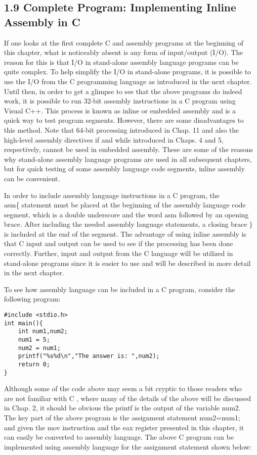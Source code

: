 \documentclass[10pt]{article}
\begin{document}
\subsection*{1.9 Complete Program: Implementing Inline Assembly in C}
If one looks at the first complete C and assembly programs at the beginning of this chapter, what is noticeably absent is any form of input/output (I/O). The reason for this is that I/O in stand-alone assembly language programs can be quite complex. To help simplify the I/O in stand-alone programs, it is possible to use the I/O from the C programming language as introduced in the next chapter. Until then, in order to get a glimpse to see that the above programs do indeed work, it is possible to run 32-bit assembly instructions in a C program using Visual C++. This process is known as inline or embedded assembly and is a quick way to test program segments. However, there are some disadvantages to this method. Note that 64-bit processing introduced in Chap. 11 and also the high-level assembly directives if and while introduced in Chaps. 4 and 5, respectively, cannot be used in embedded assembly. These are some of the reasons why stand-alone assembly language programs are used in all subsequent chapters, but for quick testing of some assembly language code segments, inline assembly can be convenient.

In order to include assembly language instructions in a C program, the $\qquad$ asm\{ statement must be placed at the beginning of the assembly language code segment, which is a double underscore and the word asm followed by an opening brace. After including the needed assembly language statements, a closing brace $\}$ is included at the end of the segment. The advantage of using inline assembly is that C input and output can be used to see if the processing has been done correctly. Further, input and output from the C language will be utilized in stand-alone programs since it is easier to use and will be described in more detail in the next chapter.

To see how assembly language can be included in a C program, consider the following program:

\begin{verbatim}
#include <stdio.h>
int main(){
    int num1,num2;
    num1 = 5;
    num2 = num1;
    printf("%s%d\n","The answer is: ",num2);
    return 0;
}
\end{verbatim}

Although some of the code above may seem a bit cryptic to those readers who are not familiar with C , where many of the details of the above will be discussed in Chap. 2, it should be obvious the printf is the output of the variable num2. The key part of the above program is the assignment statement num2=num1; and given the mov instruction and the eax register presented in this chapter, it can easily be converted to assembly language. The above C program can be implemented using assembly language for the assignment statement shown below:
\end{document}
